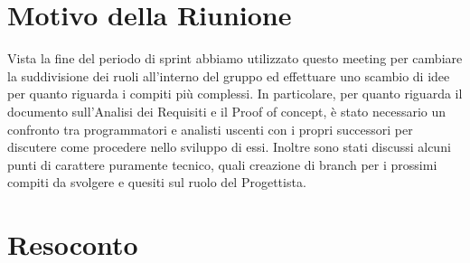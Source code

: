 \section{Motivo della Riunione}
Vista la fine del periodo di sprint abbiamo utilizzato questo meeting per cambiare la suddivisione dei ruoli all'interno del gruppo ed effettuare uno scambio di idee per quanto riguarda i compiti più complessi.
\newline In particolare, per quanto riguarda il documento sull'Analisi dei Requisiti e il Proof of concept, è stato necessario un confronto tra programmatori e analisti uscenti con i propri successori per discutere come procedere nello sviluppo di essi.
\newline Inoltre sono stati discussi alcuni punti di carattere puramente tecnico, quali creazione di branch per i prossimi compiti da svolgere e quesiti sul ruolo del Progettista.
\section{Resoconto}
